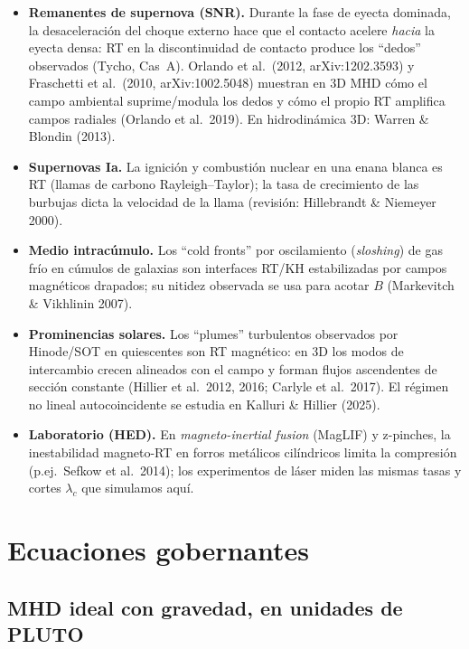 \documentclass[11pt,a4paper]{article}
\begin{document}
\begin{itemize}
  \item \textbf{Remanentes de supernova (SNR).} Durante la fase de eyecta dominada, la
  desaceleración del choque externo hace que el contacto acelere \emph{hacia} la eyecta
  densa: RT en la discontinuidad de contacto produce los ``dedos'' observados (Tycho, Cas~A).
  Orlando et al.\ (2012, arXiv:1202.3593) y Fraschetti et al.\ (2010, arXiv:1002.5048)
  muestran en 3D MHD cómo el campo ambiental suprime/modula los dedos y cómo el propio RT
  amplifica campos radiales (Orlando et al.\ 2019). En hidrodinámica 3D: Warren \& Blondin
  (2013).
  \item \textbf{Supernovas Ia.} La ignición y combustión nuclear en una enana blanca es RT
  (llamas de carbono Rayleigh--Taylor); la tasa de crecimiento de las burbujas dicta la
  velocidad de la llama (revisión: Hillebrandt \& Niemeyer 2000).
  \item \textbf{Medio intracúmulo.} Los ``cold fronts'' por oscilamiento (\emph{sloshing})
  de gas frío en cúmulos de galaxias son interfaces RT/KH estabilizadas por campos
  magnéticos drapados; su nitidez observada se usa para acotar $B$ (Markevitch \& Vikhlinin 2007).
  \item \textbf{Prominencias solares.} Los ``plumes'' turbulentos observados por Hinode/SOT
  en quiescentes son RT magnético: en 3D los modos de intercambio crecen alineados con el
  campo y forman flujos ascendentes de sección constante (Hillier et al.\ 2012, 2016;
  Carlyle et al.\ 2017). El régimen no lineal autocoincidente se estudia en Kalluri \&
  Hillier (2025).
  \item \textbf{Laboratorio (HED).} En \emph{magneto-inertial fusion} (MagLIF) y z-pinches,
  la inestabilidad magneto-RT en forros metálicos cilíndricos limita la compresión
  (p.ej.\ Sefkow et al.\ 2014); los experimentos de láser miden las mismas tasas y cortes
  $\lambda_c$ que simulamos aquí.
\end{itemize}

\section{Ecuaciones gobernantes}
\label{sec:fisica}

\subsection{MHD ideal con gravedad, en unidades de PLUTO}
\end{document}

